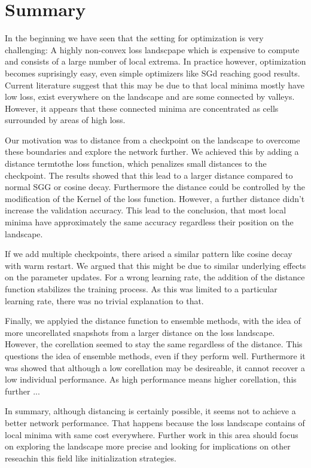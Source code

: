 \chapter{Summary}
In the beginning we have seen that the setting for optimization is very
challenging: A highly non-convex loss landscpape which is expensive to compute
and consists of a large number of local extrema. In practice however,
optimization becomes suprisingly easy, even simple optimizers like SGd reaching
good results. Current literature suggest that this may be due to that local
minima mostly have low loss, exist everywhere on the landscape and are some
connected by valleys. However, it appears that these connected minima are
concentrated as cells surrounded by areas of high loss.

Our motivation was to distance from a checkpoint on the landscape to overcome
these boundaries and explore the network further. We achieved this by adding a
distance termtothe loss function, which penalizes small distances to the
checkpoint. The results showed that this lead to a larger distance compared to
normal SGG or cosine decay. Furthermore the distance could be controlled by the
modification of the Kernel of the loss function. However, a further distance
didn't increase the validation accuracy. This lead to the conclusion, that most
local minima have approximately the same accuracy regardless their position on
the landscape.

If we add multiple checkpoints, there arised a similar pattern like cosine decay
with warm restart. We argued that this might be due to similar underlying
effects on the parameter updates. For a wrong learning rate, the addition of the
distance function stabilizes the training process. As this was limited to a
particular learning rate, there was no trivial explanation to that.

Finally, we applyied the distance function to ensemble methods, with the idea of
more uncorellated snapshots from a larger distance on the loss landscape.
However, the corellation seemed to stay the same regardless of the distance.
This questions the idea of ensemble methods, even if they perform well.
Furthermore it was showed that although a low corellation may be desireable, it
cannot recover a low individual performance. As high performance means higher corellation, this further ...


In summary, although distancing is certainly possible, it seems not to achieve a
better network performance. That happens because the loss landscape contains of
local minima with same cost everywhere. Further work in this area should focus
on exploring the landscape more precise and looking for implications on other
reseachin this field like initialization strategies.